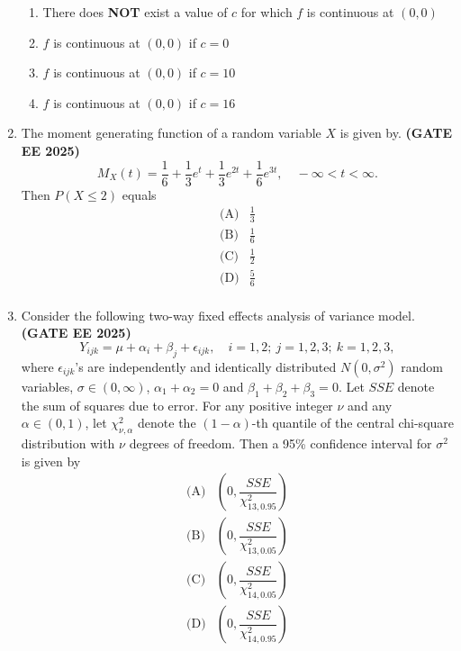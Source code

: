 \documentclass[journal,12pt,onecolumn]{IEEEtran}
\theoremstyle{remark}
\begin{document}
\begin{enumerate}
\begin{enumerate}
\item There does \textbf{NOT} exist a value of $c$ for which $f$ is continuous at $(0,0)$
\item $f$ is continuous at $(0,0)$ if $c = 0$
\item $f$ is continuous at $(0,0)$ if $c = 10$
\item $f$ is continuous at $(0,0)$ if $c = 16$
\end{enumerate}

\item The moment generating function of a random variable $X$ is given by. \hfill \textbf{(GATE EE 2025)}
\[
M_X(t) = \frac{1}{6} + \frac{1}{3}e^t + \frac{1}{3}e^{2t} + \frac{1}{6}e^{3t}, \quad -\infty < t < \infty.
\]
Then $P(X \leq 2)$ equals
\[
\begin{array}{ll}
\text{(A)} & \tfrac{1}{3} \\[6pt]
\text{(B)} & \tfrac{1}{6} \\[6pt]
\text{(C)} & \tfrac{1}{2} \\[6pt]
\text{(D)} & \tfrac{5}{6} \\
\end{array}
\]


\item Consider the following two-way fixed effects analysis of variance model. \hfill \textbf{(GATE EE 2025)}
\[
Y_{ijk} = \mu + \alpha_i + \beta_j + \epsilon_{ijk}, \quad i = 1,2; \ j=1,2,3; \ k=1,2,3,
\]
where $\epsilon_{ijk}$'s are independently and identically distributed $N(0, \sigma^2)$ random variables, 
$\sigma \in (0,\infty)$, $\alpha_1 + \alpha_2 = 0$ and $\beta_1 + \beta_2 + \beta_3 = 0$. Let $SSE$ denote the sum of squares due to error. For any positive integer $\nu$ and any $\alpha \in (0,1)$, let $\chi^2_{\nu,\alpha}$ denote the $(1-\alpha)$-th quantile of the central chi-square distribution with $\nu$ degrees of freedom. Then a 95\% confidence interval for $\sigma^2$ is given by
\[
\begin{array}{ll}
\text{(A)} & \left(0, \dfrac{SSE}{\chi^2_{13,0.95}}\right) \\[12pt]
\text{(B)} & \left(0, \dfrac{SSE}{\chi^2_{13,0.05}}\right) \\[12pt]
\text{(C)} & \left(0, \dfrac{SSE}{\chi^2_{14,0.05}}\right) \\[12pt]
\text{(D)} & \left(0, \dfrac{SSE}{\chi^2_{14,0.95}}\right) \\
\end{array}
\]



\end{enumerate}
\end{document}

